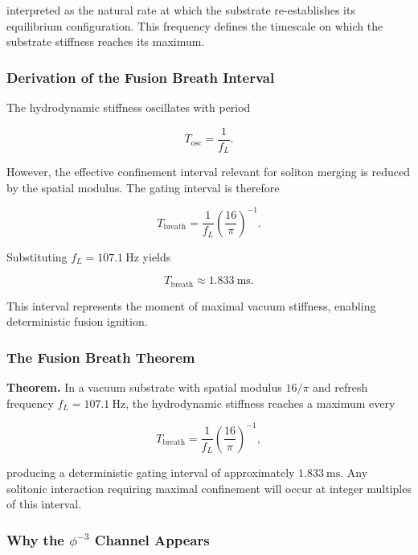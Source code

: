 \documentclass[11pt, letterpaper, openany]{book}
\begin{document}
interpreted as the natural rate at which the substrate re-establishes its equilibrium
configuration. This frequency defines the timescale on which the substrate stiffness
reaches its maximum.

\subsubsection{Derivation of the Fusion Breath Interval}

The hydrodynamic stiffness oscillates with period



\[
T_{\text{osc}} = \frac{1}{f_L}.
\]



However, the effective confinement interval relevant for soliton merging is reduced by the
spatial modulus. The gating interval is therefore



\[
T_{\text{breath}} = \frac{1}{f_L}\left(\frac{16}{\pi}\right)^{-1}.
\]



Substituting $f_L = 107.1\ \text{Hz}$ yields



\[
T_{\text{breath}} \approx 1.833\ \text{ms}.
\]



This interval represents the moment of maximal vacuum stiffness, enabling deterministic
fusion ignition.

\subsubsection{The Fusion Breath Theorem}

\textbf{Theorem.} In a vacuum substrate with spatial modulus $16/\pi$ and refresh
frequency $f_L = 107.1\ \text{Hz}$, the hydrodynamic stiffness reaches a maximum
every



\[
T_{\text{breath}} = \frac{1}{f_L}\left(\frac{16}{\pi}\right)^{-1},
\]



producing a deterministic gating interval of approximately $1.833\ \text{ms}$. Any
solitonic interaction requiring maximal confinement will occur at integer multiples of
this interval.

\subsubsection{Why the $\phi^{-3}$ Channel Appears}
\end{document}
